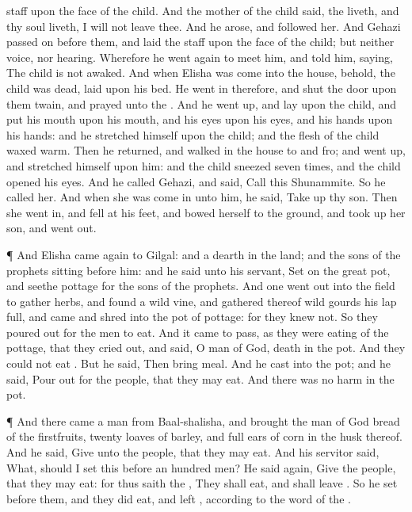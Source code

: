 {staff upon the
face of the
child.
And the
mother of the
child
said,
{} the
{}
liveth, and
{} thy
soul
liveth, I will not
leave thee. And he
arose, and
followed her.
And
Gehazi passed
on
before them, and
laid the
staff upon the
face of the
child; but
{} neither
voice, nor
hearing. Wherefore he went
again to
meet him, and
told him,
saying, The
child is not
awaked.
And when
Elisha was
come into the
house, behold, the
child was
dead,
{}
laid upon his
bed.
He went
in therefore, and
shut the
door upon them
twain, and
prayed unto the
{}.
And he went
up, and
lay upon the
child, and
put his
mouth upon his
mouth, and his
eyes upon his
eyes, and his
hands upon his
hands: and he
stretched himself upon the child; and the
flesh of the
child waxed
warm.
Then he
returned, and
walked in the
house
to and
fro; and went
up, and
stretched himself upon him: and the
child
sneezed
seven
times, and the
child
opened his
eyes.
And he
called
Gehazi, and
said,
Call this
Shunammite. So he
called her. And when she was come
in unto him, he
said, Take
up thy
son.
Then she went
in, and
fell at his
feet, and
bowed herself to the
ground, and took
up her
son, and went
out.
\par }{\PP {}¶ And
Elisha came
again to
Gilgal: and
{} a
dearth in the
land; and the
sons of the
prophets
{}
sitting
before him: and he
said unto his
servant,
Set on the
great
pot, and
seethe
pottage for the
sons of the
prophets.
And
one went
out into the
field to
gather
herbs, and
found a
wild
vine, and
gathered thereof
wild
gourds his
lap
full, and
came and
shred
{} into the
pot of
pottage: for they
knew
{} not.
So they poured
out for the
men to
eat. And it came to pass, as they were
eating of the
pottage, that they cried
out, and
said, O
{}
man of
God,
{}
death in the
pot. And they
could not
eat
{}.
But he
said, Then
bring
meal. And he
cast
{} into the
pot; and he
said, Pour
out for the
people, that they may
eat. And there was no
harm in the
pot.
\par }{\PP {}¶ And there
came a
man from
Baal-shalisha, and
brought the
man of
God
bread of the
firstfruits,
twenty
loaves of
barley, and full ears of
corn in the
husk thereof. And he
said,
Give unto the
people, that they may
eat.
And his
servitor
said, What, should I
set this
before an
hundred
men? He said
again,
Give the
people, that they may
eat: for thus
saith the
{}, They shall
eat, and shall
leave
{}.
So he
set
{}
before them, and they did
eat, and
left
{}, according to the
word of the
{}.

}
